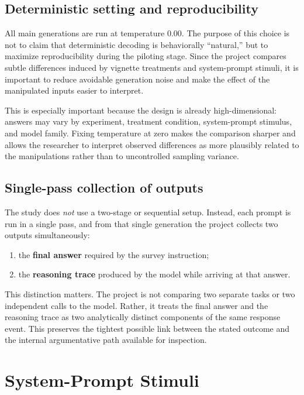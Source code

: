 \documentclass[14pt,a4paper]{extarticle}
\begin{document}
\subsection{Deterministic setting and reproducibility}

All main generations are run at temperature $0.00$. The purpose of this choice is not to claim that deterministic decoding is behaviorally ``natural,'' but to maximize reproducibility during the piloting stage. Since the project compares subtle differences induced by vignette treatments and system-prompt stimuli, it is important to reduce avoidable generation noise and make the effect of the manipulated inputs easier to interpret.

This is especially important because the design is already high-dimensional: answers may vary by experiment, treatment condition, system-prompt stimulus, and model family. Fixing temperature at zero makes the comparison sharper and allows the researcher to interpret observed differences as more plausibly related to the manipulations rather than to uncontrolled sampling variance.

\subsection{Single-pass collection of outputs}

The study does \emph{not} use a two-stage or sequential setup. Instead, each prompt is run in a single pass, and from that single generation the project collects two outputs simultaneously:

\begin{enumerate}
    \item the \textbf{final answer} required by the survey instruction;
    \item the \textbf{reasoning trace} produced by the model while arriving at that answer.
\end{enumerate}

This distinction matters. The project is not comparing two separate tasks or two independent calls to the model. Rather, it treats the final answer and the reasoning trace as two analytically distinct components of the same response event. This preserves the tightest possible link between the stated outcome and the internal argumentative path available for inspection.

\section{System-Prompt Stimuli}
\end{document}
